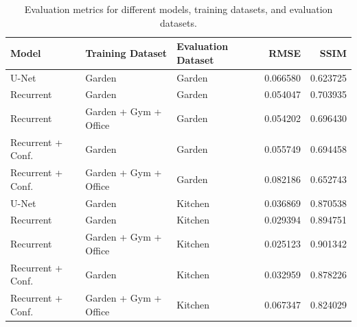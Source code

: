 \begin{table}
\caption{Evaluation metrics for different models, training datasets, and evaluation datasets.}
\label{tab:evaluation_metric_results}
\begin{tabular}{lllrr}
\toprule
Model & Training Dataset & Evaluation Dataset & RMSE & SSIM \\
\midrule
U-Net & Garden & Garden & 0.066580 & 0.623725 \\
Recurrent & Garden & Garden & 0.054047 & 0.703935 \\
Recurrent & Garden + Gym + Office & Garden & 0.054202 & 0.696430 \\
Recurrent + Conf. & Garden & Garden & 0.055749 & 0.694458 \\
Recurrent + Conf. & Garden + Gym + Office & Garden & 0.082186 & 0.652743 \\
U-Net & Garden & Kitchen & 0.036869 & 0.870538 \\
Recurrent & Garden & Kitchen & 0.029394 & 0.894751 \\
Recurrent & Garden + Gym + Office & Kitchen & 0.025123 & 0.901342 \\
Recurrent + Conf. & Garden & Kitchen & 0.032959 & 0.878226 \\
Recurrent + Conf. & Garden + Gym + Office & Kitchen & 0.067347 & 0.824029 \\
\bottomrule
\end{tabular}
\end{table}
